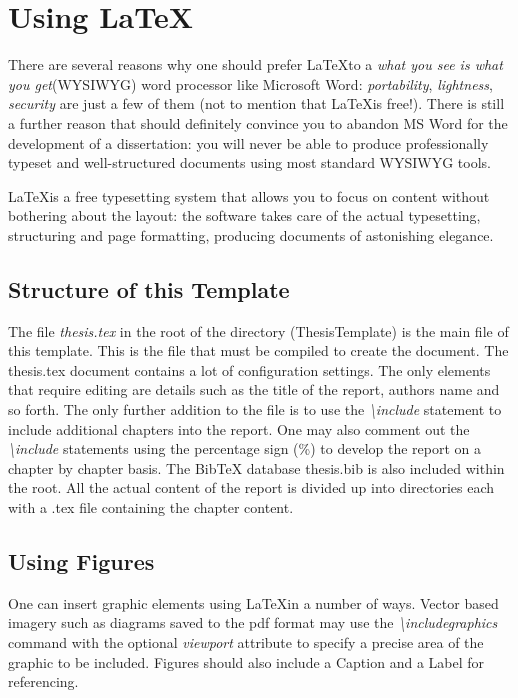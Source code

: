 \chapter{Using \LaTeX}\label{ch:usingLatex}

There are several reasons why one should prefer \LaTeX \space to a \textit{what you see is what you get}(WYSIWYG) word processor like Microsoft Word: \textsl{portability}, \textsl{lightness}, \textsl{security} are just a few of them (not to mention that \LaTeX \space is free!). There is still a further reason that should definitely convince you to abandon MS Word for the development of a dissertation: you will never be able to produce professionally typeset and well-structured documents using most standard WYSIWYG tools.

\LaTeX \space is a free typesetting system that allows you to focus on content without bothering about the layout: the software takes care of the actual typesetting, structuring and page formatting, producing documents of astonishing elegance.

\section{Structure of this Template}

The file \textit{thesis.tex} in the root of the directory (ThesisTemplate) is the main file of this template. This is the file that must be compiled to create the document. The thesis.tex document contains a lot of configuration settings. The only elements that require editing are details such as the title of the report, authors name and so forth. The only further addition to the file is to use the \emph{\textbackslash include} statement to include additional chapters into the report. One may also comment out the \emph{\textbackslash include} statements using the percentage sign (\%) to develop the report on a chapter by chapter basis. The BibTeX database thesis.bib is also included within the root. All the actual content of the report is divided up into directories each with a .tex file containing the chapter content.

\section{Using Figures}

 One can insert graphic elements using \LaTeX \space in a number of ways. Vector based imagery such as diagrams saved to the pdf format may use the \emph{\textbackslash includegraphics} command with the optional \emph{viewport} attribute to specify a precise area of the graphic to be included. Figures should also include a Caption and a Label for referencing.

